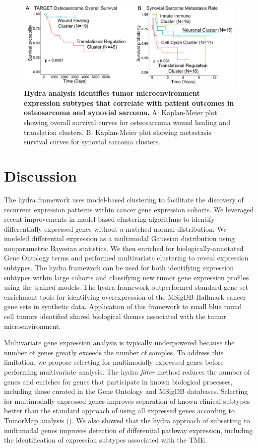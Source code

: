 \documentclass[10pt,letterpaper]{article}
\begin{document}
\begin{figure}[!h]
	\includegraphics[width=\textwidth]{img/PNG/osteosarcoma-synovial-survival-V2-2x}
	\caption{{\bf Hydra analysis identifies tumor microenvironment expression subtypes that correlate with patient outcomes in osteosarcoma and synovial sarcoma.} A: Kaplan-Meier plot showing overall survival curves for osteosarcoma wound healing and translation clusters. B: Kaplan-Meier plot showing metastasis survival curves for synovial sarcoma clusters.}
	\label{surv}
\end{figure}

\section*{Discussion}
The hydra framework uses model-based clustering to facilitate the discovery of recurrent expression patterns within cancer gene expression cohorts. We leveraged recent improvements in model-based clustering algorithms to identify differentially expressed genes without a matched normal distribution. We modeled differential expression as a multimodal Gaussian distribution using nonparametric Bayesian statistics. We then enriched for biologically-annotated Gene Ontology terms and performed multivariate clustering to reveal expression subtypes. The hydra framework can be used for both identifying expression subtypes within large cohorts and classifying new tumor gene expression profiles using the trained models. The hydra framework outperformed standard gene set enrichment tools for identifying overexpression of the MSigDB Hallmark cancer gene sets in synthetic data. Application of this framework to small blue round cell tumors identified shared biological themes associated with the tumor microenvironment.

Multivariate gene expression analysis is typically underpowered because the number of genes greatly exceeds the number of samples. To address this limitation, we propose selecting for multimodally expressed genes before performing multivariate analysis. The hydra \textit{filter} method reduces the number of genes and enriches for genes that participate in known biological processes, including those curated in the Gene Ontology and MSigDB databases. Selecting for multimodally expressed genes improves separation of known clinical subtypes better than the standard approach of using all expressed genes according to TumorMap analysis (). We also showed that the hydra approach of subsetting to multimodal genes improves detection of differential pathway expression, including the identification of expression subtypes associated with the TME.
\end{document}

